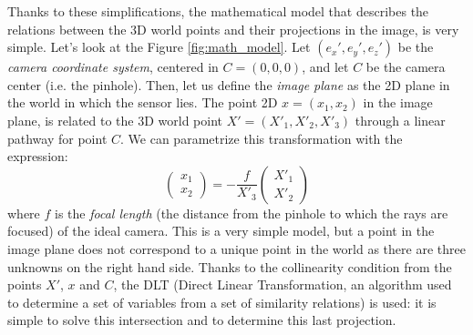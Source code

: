 Thanks to these simplifications, the mathematical model that describes the relations between the 3D world points and their projections in the image, is very simple. Let's look at the Figure \ref{fig:math_model}. 
Let $\left(e_x', e_y', e_z' \right)$ be the \textit{camera coordinate system}, centered in $C = \left(0,0,0 \right)$, and let $C$ be the camera center (i.e. the pinhole). Then, let us define the \textit{image plane} as the 2D plane in the world in which the sensor lies. The point 2D $x = (x_1, x_2)$ in the image plane, is related to the 3D world point $X' = (X'_1, X'_2, X'_3)$ through a linear pathway for point $C$. We can parametrize this transformation with the expression:
  \begin{equation}
    \begin{pmatrix} x_1 \\ x_2 \end{pmatrix} = - \frac{f}{X'_3} \begin{pmatrix} X'_1 \\ X'_2 \end{pmatrix}
    \label{eq:image-plane}
  \end{equation}
where $f$ is the \textit{focal length} (the distance from the pinhole to which the rays are focused) of the ideal camera. This is a very simple model, but a point in the image plane does not correspond to a unique point in the world as there are three unknowns on the right hand side. Thanks to the collinearity condition from the points $X'$, $x$ and $C$, the \acs{DLT} (Direct Linear Transformation, an algorithm used to determine a set of variables from a set of similarity relations) is used: it is simple to solve this intersection and to determine this last projection. \\

